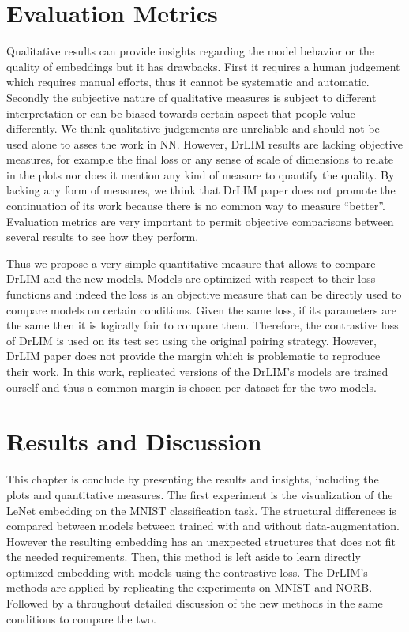 \documentclass[a4paper,12pt]{report}
\begin{document}
\section{Evaluation Metrics}
Qualitative results can provide insights regarding the model behavior or the quality of embeddings but it has drawbacks.
First it requires a human judgement which requires manual efforts, thus it cannot be systematic and automatic.
Secondly the subjective nature of qualitative measures is subject to different interpretation or can be biased towards certain aspect that people value differently.
We think qualitative judgements are unreliable and should not be used alone to asses the work in NN.
However, DrLIM results are lacking objective measures, for example the final loss or any sense of scale of dimensions to relate in the plots nor does it mention any kind of measure to quantify the quality.
By lacking any form of measures, we think that DrLIM paper does not promote the continuation of its work because there is no common way to measure ``better''.
Evaluation metrics are very important to permit objective comparisons between several results to see how they perform.

Thus we propose a very simple quantitative measure that allows to compare DrLIM and the new models.
Models are optimized with respect to their loss functions and indeed the loss is an objective measure that can be directly used to compare models on certain conditions.
Given the same loss, if its parameters are the same then it is logically fair to compare them.
Therefore, the contrastive loss of DrLIM is used on its test set using the original pairing strategy.
However, DrLIM paper does not provide the margin which is problematic to reproduce their work.
In this work, replicated versions of the DrLIM's models are trained ourself and thus a common margin is chosen per dataset for the two models.

\section{Results and Discussion}

This chapter is conclude by presenting the results and insights, including the plots and quantitative measures.
The first experiment is the visualization of the LeNet embedding on the MNIST classification task.
The structural differences is compared between models between trained with and without data-augmentation.
However the resulting embedding has an unexpected structures that does not fit the needed requirements.
Then, this method is left aside to learn directly optimized embedding with models using the contrastive loss.
The DrLIM's methods are applied by replicating the experiments on MNIST and NORB.
Followed by a throughout detailed discussion of the new methods in the same conditions to compare the two.
\end{document}

